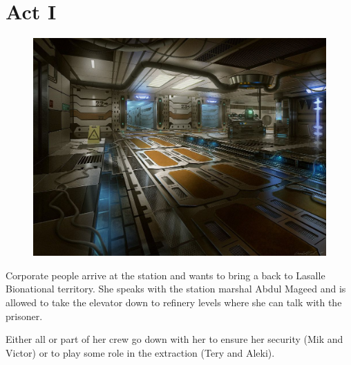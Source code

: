 \chapter{Act I}



\begin{figure}
    \centering
    \includegraphics[width=.45\textwidth]{img/bg/interior.jpg}
\end{figure}



\begin{rpg-commentbox}{}

    Corporate people arrive at the station and  wants to bring a  back to Lasalle Bionational territory. She speaks with the station marshal Abdul Mageed and is allowed to take the elevator down to refinery levels where she can talk with the prisoner.

    Either all or part of her crew go down with her to ensure her security (Mik and Victor) or to play some role in the extraction (Tery and Aleki). 
    
\end{rpg-commentbox}







